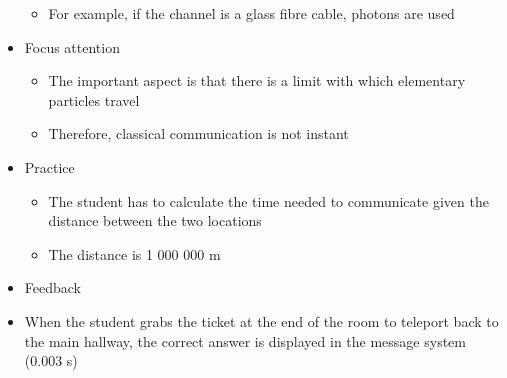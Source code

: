 \documentclass[11pt,twoside]{report} %
\begin{document}
\begin{itemize}
\begin{itemize}
			\item For example, if the channel is a glass fibre cable, photons are used
		\end{itemize}
		\item Focus attention
		\begin{itemize}
			\item The important aspect is that there is a limit with which elementary particles travel
			\item Therefore, classical communication is not instant
		\end{itemize}			
		\item Practice
		\begin{itemize}
			\item The student has to calculate the time needed to communicate given the distance between the two locations
			\item The distance is 1 000 000 m
		\end{itemize}
		\item Feedback
			\item When the student grabs the ticket at the end of the room to teleport back to the main hallway, the correct answer is displayed in the message system (0.003 s)
	\end{itemize}
\end{document}
